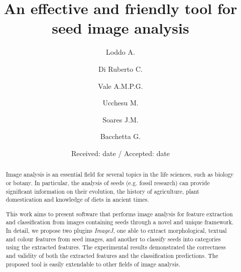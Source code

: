 \documentclass[twocolumn]{svjour3}           %
\begin{document}
\title{An effective and friendly tool for seed image analysis}


\author{Loddo A. \and
	Di Ruberto C. \and
	Vale A.M.P.G. \and
	Ucchesu M. \and
	Soares J.M. \and
	Bacchetta G.
}



\date{Received: date / Accepted: date}

\maketitle

\begin{abstract}
	Image analysis is an essential field for several topics in the life sciences, such as biology or botany. In particular, the analysis of seeds (e.g. fossil research) can provide significant information on their evolution, the history of agriculture, plant domestication and knowledge of diets in ancient times. 
	
	This work aims to present software that performs image analysis for feature extraction and classification from images containing seeds through a novel and unique framework. In detail, we propose two plugins \emph{ImageJ}, one able to extract morphological, textual and colour features from seed images, and another to classify seeds into categories using the extracted features. The experimental results demonstrated the correctness and validity of both the extracted features and the classification predictions. The proposed tool is easily extendable to other fields of image analysis.
\end{abstract}
\end{document}
